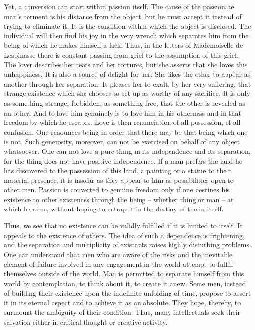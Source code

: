\documentclass[11pt]{article}
\begin{document}
Yet, a conversion can start within passion itself. The cause of the passionate man’s torment is his distance from the object; but he must accept it instead of trying to eliminate it. It is the condition within which the object is disclosed. The individual will then find his joy in the very wrench which separates him from the being of which he makes himself a lack. Thus, in the letters of Mademoiselle de Lespinasse there is constant passing from grief to the assumption of this grief. The lover describes her tears and her tortures, but she asserts that she loves this unhappiness. It is also a source of delight for her. She likes the other to appear as another through her separation. It pleases her to exalt, by her very suffering, that strange existence which she chooses to set up as worthy of any sacrifice. It is only as something strange, forbidden, as something free, that the other is revealed as an other. And to love him genuinely is to love him in his otherness and in that freedom by which he escapes. Love is then renunciation of all possession, of all confusion. One renounces being in order that there may be that being which one is not. Such generosity, moreover, can not be exercised on behalf of any object whatsoever. One can not love a pure thing in its independence and its separation, for the thing does not have positive independence. If a man prefers the land he has discovered to the possession of this land, a painting or a statue to their material presence, it is insofar as they appear to him as possibilities open to other men. Passion is converted to genuine freedom only if one destines his existence to other existences through the being – whether thing or man – at which he aims, without hoping to entrap it in the destiny of the in-itself.

Thus, we see that no existence can be validly fulfilled if it is limited to itself. It appeals to the existence of others. The idea of such a dependence is frightening, and the separation and multiplicity of existants raises highly disturbing problems. One can understand that men who are aware of the risks and the inevitable element of failure involved in any engagement in the world attempt to fulfill themselves outside of the world. Man is permitted to separate himself from this world by contemplation, to think about it, to create it anew. Some men, instead of building their existence upon the indefinite unfolding of time, propose to assert it in its eternal aspect and to achieve it as an absolute. They hope, thereby, to surmount the ambiguity of their condition. Thus, many intellectuals seek their salvation either in critical thought or creative activity.
\end{document}
